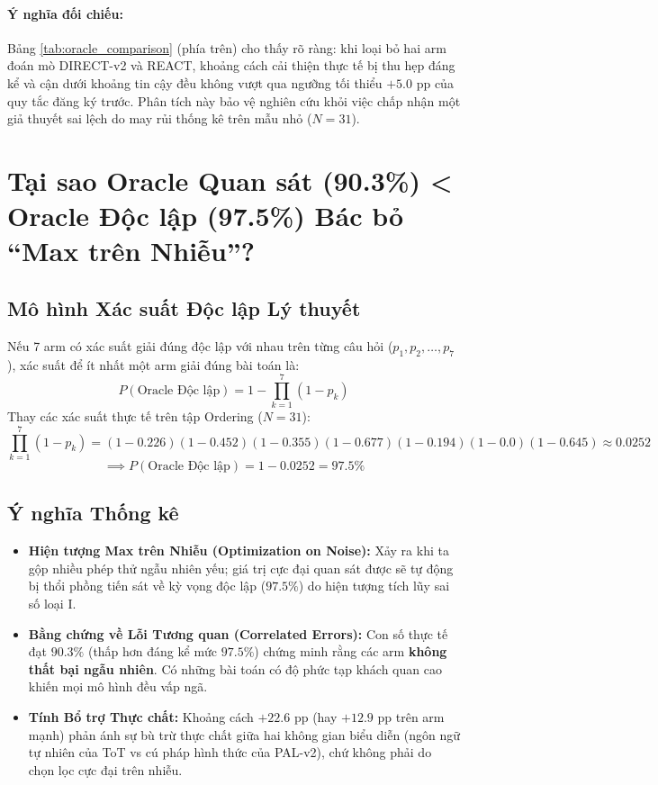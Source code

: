 \documentclass[11pt,a4paper]{report}
\begin{document}
\paragraph{Ý nghĩa đối chiếu:} Bảng \ref{tab:oracle_comparison} (phía trên) cho thấy rõ ràng: khi loại bỏ hai arm đoán mò DIRECT-v2 và REACT, khoảng cách cải thiện thực tế bị thu hẹp đáng kể và cận dưới khoảng tin cậy đều không vượt qua ngưỡng tối thiểu $+5.0$ pp của quy tắc đăng ký trước. Phân tích này bảo vệ nghiên cứu khỏi việc chấp nhận một giả thuyết sai lệch do may rủi thống kê trên mẫu nhỏ ($N=31$).

\section{Tại sao Oracle Quan sát (90.3\%) < Oracle Độc lập (97.5\%) Bác bỏ ``Max trên Nhiễu''?}

\subsection{Mô hình Xác suất Độc lập Lý thuyết}
Nếu 7 arm có xác suất giải đúng độc lập với nhau trên từng câu hỏi ($p_1, p_2, \dots, p_7$), xác suất để ít nhất một arm giải đúng bài toán là:
$$P(\text{Oracle Độc lập}) = 1 - \prod_{k=1}^7 (1 - p_k)$$
Thay các xác suất thực tế trên tập Ordering ($N=31$):
$$\prod_{k=1}^7 (1 - p_k) = (1 - 0.226)(1 - 0.452)(1 - 0.355)(1 - 0.677)(1 - 0.194)(1 - 0.0)(1 - 0.645) \approx 0.0252$$
$$\implies P(\text{Oracle Độc lập}) = 1 - 0.0252 = \mathbf{97.5\%}$$

\subsection{Ý nghĩa Thống kê}
\begin{itemize}[leftmargin=*]
    \item \textbf{Hiện tượng Max trên Nhiễu (Optimization on Noise):} Xảy ra khi ta gộp nhiều phép thử ngẫu nhiên yếu; giá trị cực đại quan sát được sẽ tự động bị thổi phồng tiến sát về kỳ vọng độc lập ($97.5\%$) do hiện tượng tích lũy sai số loại I.
    \item \textbf{Bằng chứng về Lỗi Tương quan (Correlated Errors):} Con số thực tế đạt $90.3\%$ (thấp hơn đáng kể mức $97.5\%$) chứng minh rằng các arm \textbf{không thất bại ngẫu nhiên}. Có những bài toán có độ phức tạp khách quan cao khiến mọi mô hình đều vấp ngã.
    \item \textbf{Tính Bổ trợ Thực chất:} Khoảng cách $+22.6$ pp (hay $+12.9$ pp trên arm mạnh) phản ánh sự bù trừ thực chất giữa hai không gian biểu diễn (ngôn ngữ tự nhiên của ToT vs cú pháp hình thức của PAL-v2), chứ không phải do chọn lọc cực đại trên nhiễu.
\end{itemize}
\end{document}
